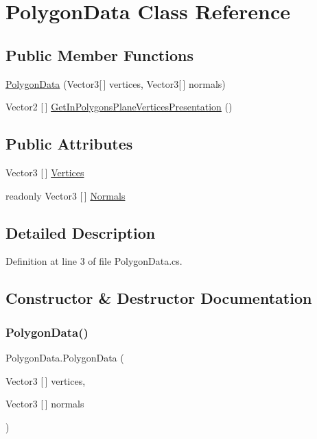 \hypertarget{class_polygon_data}{}\section{Polygon\+Data Class Reference}
\label{class_polygon_data}
\subsection*{Public Member Functions}
\begin{DoxyCompactItemize}
\item 
\mbox{\hyperlink{class_polygon_data_a1530c00aaaaedfbbbfc3bb17c7496afc}{Polygon\+Data}} (Vector3\mbox{[}$\,$\mbox{]} vertices, Vector3\mbox{[}$\,$\mbox{]} normals)
\item 
Vector2 \mbox{[}$\,$\mbox{]} \mbox{\hyperlink{class_polygon_data_a024ebb4875136879c093b7ba08a8b2c9}{Get\+In\+Polygons\+Plane\+Vertices\+Presentation}} ()
\end{DoxyCompactItemize}
\subsection*{Public Attributes}
\begin{DoxyCompactItemize}
\item 
Vector3 \mbox{[}$\,$\mbox{]} \mbox{\hyperlink{class_polygon_data_ae9dfaa860511424803cd74822927bcac}{Vertices}}
\item 
readonly Vector3 \mbox{[}$\,$\mbox{]} \mbox{\hyperlink{class_polygon_data_ad74733d05200dc339426df8e49a9ca6a}{Normals}}
\end{DoxyCompactItemize}


\subsection{Detailed Description}


Definition at line 3 of file Polygon\+Data.\+cs.



\subsection{Constructor \& Destructor Documentation}
\mbox{\label{class_polygon_data_a1530c00aaaaedfbbbfc3bb17c7496afc}} 
\subsubsection{\texorpdfstring{PolygonData()}{PolygonData()}}
{\footnotesize\ttfamily Polygon\+Data.\+Polygon\+Data (\begin{DoxyParamCaption}\item[{Vector3 \mbox{[}$\,$\mbox{]}}]{vertices,  }\item[{Vector3 \mbox{[}$\,$\mbox{]}}]{normals }\end{DoxyParamCaption})}



